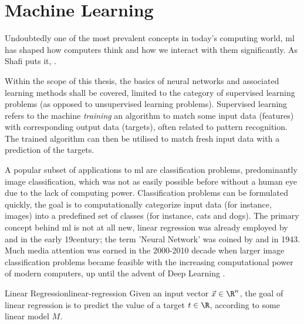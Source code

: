 \section{Machine Learning}
\label{sec:machine-learning}
Undoubtedly one of the most prevalent concepts in today's computing world, \gls{ml} has shaped how computers think and how we interact with them significantly.
As Shafi  puts it, .

Within the scope of this thesis, the basics of neural networks and associated learning methods shall be covered, limited to the category of supervised learning problems (as opposed to unsupervised learning problems).
Supervised learning refers to the machine \textit{training} an algorithm to match some input data (features) with corresponding output data (targets), often related to pattern recognition.
The trained algorithm can then be utilised to match fresh input data with a prediction of the targets.

A popular subset of applications to \gls{ml} are classification problems, predominantly image classification, which was not as easily possible before without a human eye due to the lack of computing power.
Classification problems can be formulated quickly, the goal is to computationally categorize input data (for instance, images) into a predefined set of classes (for instance, cats and dogs).
The primary concept behind \acrlong{ml} is not at all new, linear regression was already employed by  and  in the early 19\th century; the term 'Neural Network' was coined by  and  in 1943.
Much media attention was earned in the 2000-2010 decade when larger image classification problems became feasible with the increasing computational power of modern computers, up until the advent of Deep Learning \parencite{bishop-pattern-recognition-and-ml}.

\begin{definition}{Linear Regression}{linear-regression}
  Given an input vector $\vec{x} \in \R^n$, the goal of linear regression is to predict the value of a target $t \in \R$, according to some linear model $M$.
\end{definition}

